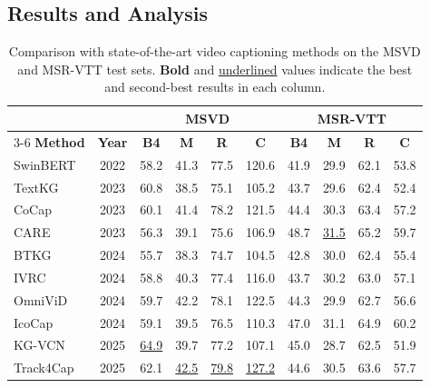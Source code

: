 \subsection{Results and Analysis}
\label{subsec:subsec_54_main_results}
\begin{table}[!t]
\caption{Comparison with state-of-the-art video captioning methods on the MSVD and MSR-VTT test sets. \textbf{Bold} and \underline{underlined} values indicate the best and second-best results in each column.}
\label{tab:sota_msvd_msrvtt}
\centering
\begin{tabular}{l c cccc cccc}
\hline\hline
 & & \multicolumn{4}{c}{\textbf{MSVD}} & \multicolumn{4}{c}{\textbf{MSR-VTT}} \\
\cline{3-6} \cline{7-10}
\textbf{Method} & \textbf{Year} & \textbf{B4} & \textbf{M} & \textbf{R} & \textbf{C} & \textbf{B4} & \textbf{M} & \textbf{R} & \textbf{C} \\
\hline
SwinBERT~\cite{linSwinBERTEndtoEndTransformers2022} & 2022 & 58.2 & 41.3 & 77.5 & 120.6 & 41.9 & 29.9 & 62.1 & 53.8 \\
TextKG~\cite{guTextKnowledgeGraph2023} & 2023 & 60.8 & 38.5 & 75.1 & 105.2 & 43.7 & 29.6 & 62.4 & 52.4 \\
CoCap~\cite{shenAccurateFastCompressed2023} & 2023 & 60.1 & 41.4 & 78.2 & 121.5 & 44.4 & 30.3 & 63.4 & 57.2 \\
CARE~\cite{yangConceptAwareVideoCaptioning2023} & 2023 & 56.3 & 39.1 & 75.6 & 106.9 & 48.7 & \underline{31.5} & 65.2 & 59.7 \\
BTKG~\cite{zhongBidirectionalTransformerKnowledge2024} & 2024 & 55.7 & 38.3 & 74.7 & 104.5 & 42.8 & 30.0 & 62.4 & 55.4 \\
IVRC~\cite{tianRethinkVideoRetrieval2024} & 2024 & 58.8 & 40.3 & 77.4 & 116.0 & 43.7 & 30.2 & 63.0 & 57.1 \\
OmniViD~\cite{wangOmniViDGenerativeFramework2024} & 2024 & 59.7 & 42.2 & 78.1 & 122.5 & 44.3 & 29.9 & 62.7 & 56.6 \\
IcoCap~\cite{liangIcoCapImprovingVideo2024} & 2024 & 59.1 & 39.5 & 76.5 & 110.3 & 47.0 & 31.1 & 64.9 & 60.2 \\
KG-VCN~\cite{yuanFullyExploringObject2025} & 2025 & \underline{64.9} & 39.7 & 77.2 & 107.1 & 45.0 & 28.7 & 62.5 & 51.9 \\
Track4Cap~\cite{luoFramebyFrameMultiObjectTrackingGuided2025} & 2025 & 62.1 & \underline{42.5} & \underline{79.8} & \underline{127.2} & 44.6 & 30.5 & 63.6 & 57.7 \\

\end{tabular}
\end{table}
